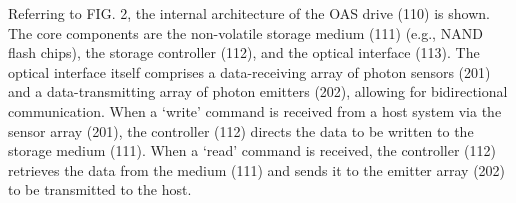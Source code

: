 \documentclass[11pt,letterpaper]{article}
\begin{document}
Referring to FIG. 2, the internal architecture of the OAS drive (110) is shown. The core components are the non-volatile storage medium (111) (e.g., NAND flash chips), the storage controller (112), and the optical interface (113). The optical interface itself comprises a data-receiving array of photon sensors (201) and a data-transmitting array of photon emitters (202), allowing for bidirectional communication. When a `write' command is received from a host system via the sensor array (201), the controller (112) directs the data to be written to the storage medium (111). When a `read' command is received, the controller (112) retrieves the data from the medium (111) and sends it to the emitter array (202) to be transmitted to the host.
\end{document}
